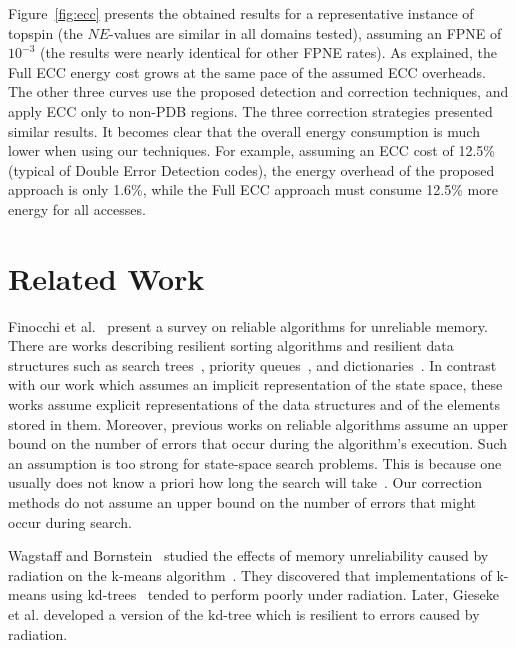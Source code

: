 \documentclass[letterpaper]{article}
\begin{document}
Figure~\ref{fig:ecc} presents the obtained results for a representative instance of topspin (the $NE$-values are similar in all domains tested), assuming an FPNE of $10^{-3}$ (the results were nearly identical for other FPNE rates). As explained, the Full ECC energy cost grows at the same pace of the assumed ECC overheads. The other three curves use the proposed detection and correction techniques, and apply ECC only to non-PDB regions. The three correction strategies presented similar results.  It becomes clear that the overall energy consumption is much lower when using our techniques. For example, assuming an ECC cost of 12.5\% (typical of Double Error Detection codes), the energy overhead of the proposed approach is only 1.6\%, while the Full ECC approach must consume 12.5\% more energy for all accesses.



\vspace{-0.91mm}
\vspace{-1.57mm}
\section{Related Work}

Finocchi et al.~ present a survey on reliable algorithms for unreliable memory. There are works describing resilient sorting algorithms and resilient data structures such as search trees~\cite{finocchi2007resilient}, priority queues~\cite{jorgensen2007priority}, and dictionaries~\cite{brodal2007optimal}. In contrast with our work which assumes an implicit representation of the state space, these works assume explicit representations of the data structures and of the elements stored in them. Moreover, previous works on reliable algorithms assume an upper bound on the number of errors that occur during the algorithm's execution. Such an assumption is too strong for state-space search problems. This is because one usually does not know a priori how long the search will take~\cite{Knuth75}. Our correction methods do not assume an upper bound on the number of errors that might occur during search.

Wagstaff and Bornstein~ studied the effects of memory unreliability caused by radiation on the k-means algorithm~\cite{mcqueen67}. %
They discovered that implementations of k-means using kd-trees~\cite{Kanetal2002} tended to perform poorly under radiation. Later, Gieseke et al.  developed a version of the kd-tree which is resilient to errors caused by radiation.
\end{document}
